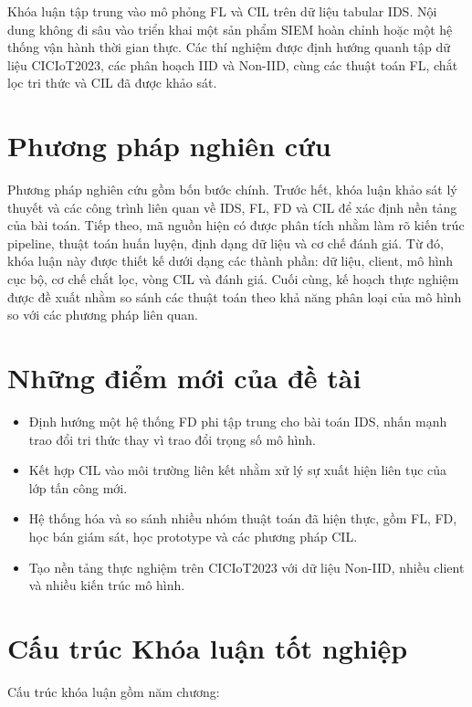 Khóa luận tập trung vào mô phỏng FL và CIL trên dữ liệu tabular IDS. Nội dung không đi sâu vào triển khai một sản phẩm SIEM hoàn chỉnh hoặc một hệ thống vận hành thời gian thực. Các thí nghiệm được định hướng quanh tập dữ liệu CICIoT2023, các phân hoạch IID và Non-IID, cùng các thuật toán FL, chắt lọc tri thức và CIL đã được khảo sát.

\section{Phương pháp nghiên cứu}

Phương pháp nghiên cứu gồm bốn bước chính. Trước hết, khóa luận khảo sát lý thuyết và các công trình liên quan về IDS, FL, FD và CIL để xác định nền tảng của bài toán. Tiếp theo, mã nguồn hiện có được phân tích nhằm làm rõ kiến trúc pipeline, thuật toán huấn luyện, định dạng dữ liệu và cơ chế đánh giá. Từ đó, khóa luận này được thiết kế dưới dạng các thành phần: dữ liệu, client, mô hình cục bộ, cơ chế chắt lọc, vòng CIL và đánh giá. Cuối cùng, kế hoạch thực nghiệm được đề xuất nhằm so sánh các thuật toán theo khả năng phân loại của mô hình so với các phương pháp liên quan.

\section{Những điểm mới của đề tài}

\begin{itemize}
    \item Định hướng một hệ thống FD phi tập trung cho bài toán IDS, nhấn mạnh trao đổi tri thức thay vì trao đổi trọng số mô hình.
    \item Kết hợp CIL vào môi trường liên kết nhằm xử lý sự xuất hiện liên tục của lớp tấn công mới.
    \item Hệ thống hóa và so sánh nhiều nhóm thuật toán đã hiện thực, gồm FL, FD, học bán giám sát, học prototype và các phương pháp CIL.
    \item Tạo nền tảng thực nghiệm trên CICIoT2023 với dữ liệu Non-IID, nhiều client và nhiều kiến trúc mô hình.
\end{itemize}

\section{Cấu trúc Khóa luận tốt nghiệp}

Cấu trúc khóa luận gồm năm chương:


